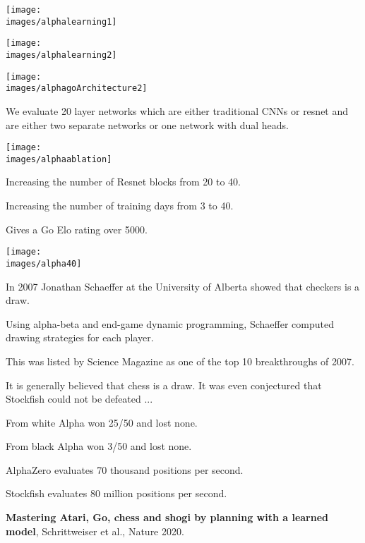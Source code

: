 {\centerline{\texttt{[image: \\images/alphalearning1]}}


\centerline{\texttt{[image: \\images/alphalearning2]}}


\centerline{\texttt{[image: \\images/alphagoArchitecture2]}}

\vfill
We evaluate 20 layer networks which are either traditional CNNs or resnet and are either two separate networks or one network with dual heads.


\centerline{\texttt{[image: \\images/alphaablation]}}


Increasing the number of Resnet blocks from 20 to 40.

\vfill
Increasing the number of training days from 3 to 40.

\vfill
Gives a Go Elo rating over 5000.


\centerline{\texttt{[image: \\images/alpha40]}}


In 2007 Jonathan Schaeffer at the University of Alberta showed that checkers is a draw.

\vfill
Using alpha-beta and end-game dynamic programming, Schaeffer computed drawing strategies for each player.

\vfill
This was listed by Science Magazine as one of the top 10 breakthroughs of 2007.

\vfill
It is generally believed that chess is a draw.  It was even conjectured that Stockfish could not be defeated ...


From white Alpha won 25/50 and lost none.

\vfill
From black Alpha won 3/50 and lost none.

\vfill
AlphaZero evaluates 70 thousand positions per second.

\vfill
Stockfish evaluates 80 million positions per second.


{\bf Mastering Atari, Go, chess and shogi by planning with a learned model}, Schrittweiser et al., Nature 2020.

}
